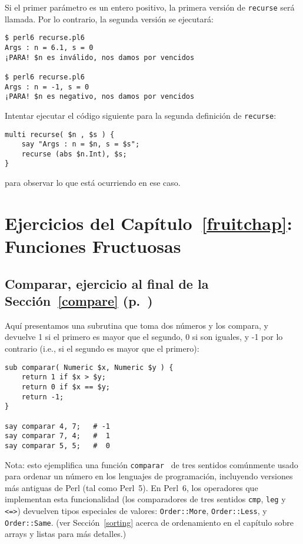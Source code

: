 Si el primer parámetro es un entero positivo, la primera
versión de {\tt recurse} será llamada. Por lo contrario, 
la segunda versión se ejecutará:

\begin{verbatim}
$ perl6 recurse.pl6
Args : n = 6.1, s = 0
¡PARA! $n es inválido, nos damos por vencidos

$ perl6 recurse.pl6
Args : n = -1, s = 0
¡PARA! $n es negativo, nos damos por vencidos
\end{verbatim}
%

Intentar ejecutar el código siguiente para la segunda
definición de {\tt recurse}:

\begin{verbatim}
multi recurse( $n , $s ) {
    say "Args : n = $n, s = $s";
    recurse (abs $n.Int), $s;
}
\end{verbatim}
%
para observar lo que está ocurriendo en ese caso.

\section{Ejercicios del Capítulo~\ref{fruitchap}: Funciones Fructuosas}

\subsection{Comparar, ejercicio al final de la Sección~\ref{compare} (p.~\pageref{compare})}
\label{sol_compare}

Aquí presentamos una subrutina que toma dos números y los compara,
y devuelve 1 si el primero es mayor que el segundo, 0 si son iguales,
y -1 por lo contrario (i.e., si el segundo es mayor que el primero):

\begin{verbatim}
sub comparar( Numeric $x, Numeric $y ) {
    return 1 if $x > $y;
    return 0 if $x == $y;
    return -1;
}

say comparar 4, 7;   # -1
say comparar 7, 4;   #  1
say comparar 5, 5;   #  0
\end{verbatim}

Nota: esto ejemplifica una función {\tt comparar } de tres
sentidos comúnmente usado para ordenar un número en los
lenguajes de programación, incluyendo versiones más antiguas 
de Perl (tal como Perl~5). En Perl~6, los operadores que 
implementan esta funcionalidad (los comparadores de tres
sentidos \verb|cmp|, \verb|leg| y \verb'<=>') devuelven tipos 
especiales de valores: {\tt Order::More}, {\tt Order::Less}, y 
{\tt Order::Same}. (ver Sección~\ref{sorting} 
\ifplastex \else
acerca de ordenamiento en el capítulo sobre arrays y listas 
\fi
para más detalles.)

